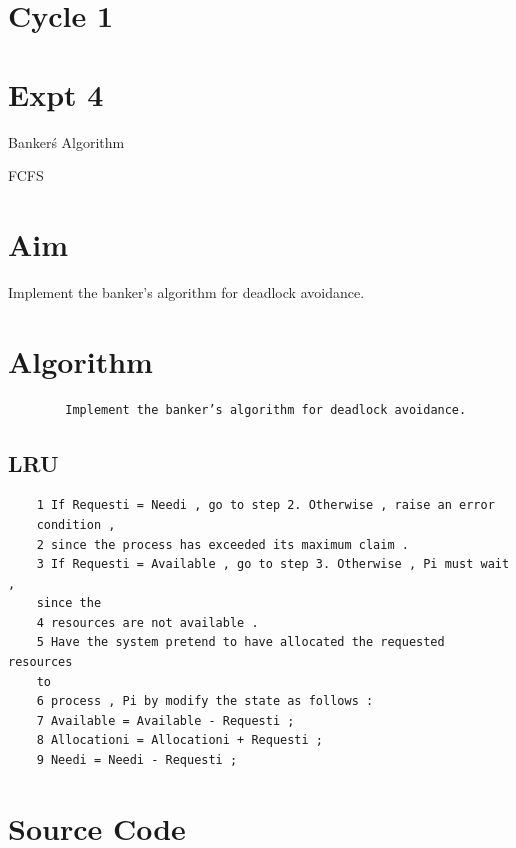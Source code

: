 \documentclass[13pt,oneside]{book}
\begin{document}
\section*{Cycle 1}
\section*{Expt 4}
\begin{center}
    \Large{Banker\'s Algorithm}
\end{center}FCFS
\section*{Aim}
\large
Implement the banker’s algorithm for deadlock avoidance.

\section*{Algorithm}
    \begin{verbatim}
		Implement the banker’s algorithm for deadlock avoidance.
    \end{verbatim}  
    \subsection*{LRU}
    \begin{verbatim}
	1 If Requesti = Needi , go to step 2. Otherwise , raise an error
	condition ,
	2 since the process has exceeded its maximum claim .
	3 If Requesti = Available , go to step 3. Otherwise , Pi must wait ,
	since the
	4 resources are not available .
	5 Have the system pretend to have allocated the requested resources
	to
	6 process , Pi by modify the state as follows :
	7 Available = Available - Requesti ;
	8 Allocationi = Allocationi + Requesti ;
	9 Needi = Needi - Requesti ;
	\end{verbatim}

\section*{Source Code}
\small
\end{document}
